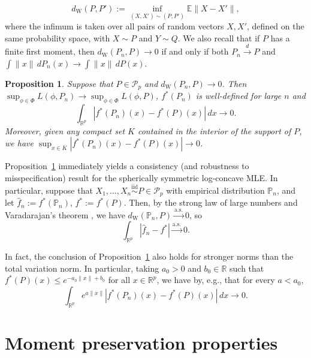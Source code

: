 \documentclass[a4paper,12pt]{article}
\newtheorem{proposition}[theorem]{Proposition}
\newenvironment{remark}[1][Remark:]{\begin{trivlist}
\item[\hskip \labelsep {\bfseries #1}]}{\end{trivlist}}
\begin{document}
\[
d_\mathrm{W}(P,P') := \inf_{(X,X') \sim (P,P')} \mathbb{E}\|X-X'\|,
\]
where the infimum is taken over all pairs of random vectors $X,X'$, defined on the same probability space, with $X \sim P$ and $Y \sim Q$.  We also recall that if $P$ has a finite first moment, then $d_\mathrm{W}(P_n,P) \rightarrow 0$ if and only if both $P_n \stackrel{d}{\rightarrow} P$ and $\int \|x\| \, dP_n(x) \rightarrow \int \|x\| \, dP(x)$.
\begin{proposition}
\label{Prop:Continuity}
Suppose that $P \in \mathcal{P}_p$ and $d_\mathrm{W}(P_n,P) \rightarrow 0$.  Then $\sup_{\phi \in \Phi} L(\phi,P_n) \rightarrow \sup_{\phi \in \Phi} L(\phi,P)$, $f^*(P_n)$ is well-defined for large $n$ and 
\begin{equation}
\label{Eq:TVConv}
\int_{\mathbb{R}^p} |f^*(P_n)(x) - f^*(P)(x)| \, dx \rightarrow 0.
\end{equation}
Moreover, given any compact set $K$ contained in the interior of the support of $P$, we have $\sup_{x \in K} |f^*(P_n)(x) - f^*(P)(x)| \rightarrow 0$. 
\end{proposition}
\begin{remark}
Proposition~\ref{Prop:Continuity} immediately yields a consistency (and robustness to misspecification) result for the spherically symmetric log-concave MLE.  In particular, suppose that  $X_1,\ldots,X_n \stackrel{\mathrm{iid}}{\sim} P \in \mathcal{P}_p$ with empirical distribution $\mathbb{P}_n$, and let $\hat{f}_n := f^*(\mathbb{P}_n)$, $f^* := f^*(P)$.  Then, by the strong law of large numbers and Varadarajan's theorem \citep[e.g.][Theorem~11.4.1]{dudley2002real}, we have $d_{\mathrm{W}}(\mathbb{P}_n,P) \stackrel{\mathrm{a.s.}}{\rightarrow} 0$, so
\[
\int_{\mathbb{R}^p} |\hat{f}_n - f^*| \stackrel{\mathrm{a.s.}}{\rightarrow} 0.
\]
\end{remark}
\begin{remark}
In fact, the conclusion of Proposition~\ref{Prop:Continuity} also holds for stronger norms than the total variation norm.  In particular, taking $a_0 > 0$ and $b_0 \in \mathbb{R}$ such that $f^*(P)(x) \leq e^{-a_0\|x\|+b_0}$ for all $x \in \mathbb{R}^p$, we have by, e.g., \citet[][Proposition~2]{cule2010theoretical} that for every $a < a_0$,
\[
\int_{\mathbb{R}^p} e^{a\|x\|}|f^*(P_n)(x) - f^*(P)(x)| \, dx \rightarrow 0.
\]
\end{remark}

\section{Moment preservation properties}
\label{Sec:Moments}
\end{document}
